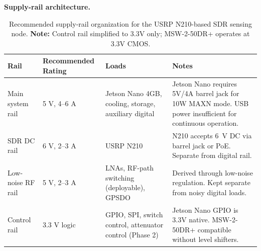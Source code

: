 \documentclass[11pt,a4paper]{article}
\begin{document}
	\noindent
	\textbf{Supply-rail architecture.}
	\begin{table}[htbp]
		\centering
		\small
		\begin{tabular}{p{3.2cm}p{3.0cm}p{3.2cm}p{5.0cm}}
			\toprule
			\textbf{Rail} &
			\textbf{Recommended Rating} &
			\textbf{Loads} &
			\textbf{Notes} \\
			\midrule
			
			Main system rail &
			5 V, 4--6 A &
			Jetson Nano 4GB, cooling, storage, auxiliary digital &
			Jetson Nano requires 5V/4A barrel jack for 10W MAXN mode. USB power
			insufficient for continuous operation. \\
			
			SDR DC rail &
			6 V, 2--3 A &
			USRP N210 &
			N210 accepts 6~V DC via barrel jack or PoE. Separate from digital rail. \\
			
			Low-noise RF rail &
			5 V, 2--3 A &
			LNAs, RF-path switching (deployable), GPSDO &
			Derived through low-noise regulation. Kept separate from noisy digital loads. \\
			
			Control rail &
			3.3 V logic &
			GPIO, SPI, switch control, attenuator control (Phase 2) &
			Jetson Nano GPIO is 3.3V native. MSW-2-50DR+ compatible without level shifters. \\
			
			\bottomrule
		\end{tabular}
		\caption{Recommended supply-rail organization for the USRP N210-based SDR sensing node.
			\textbf{Note:} Control rail simplified to 3.3V only; MSW-2-50DR+ operates at 3.3V CMOS.}
		\label{tab:supply-rail-architecture}
	\end{table}
	
\end{document}
